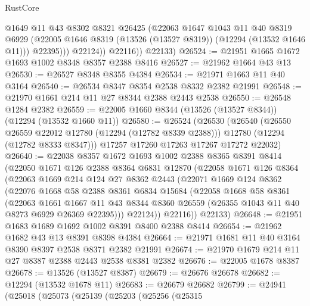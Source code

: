 \begin{lexlean}{RustCore}
\begin{coremodule}
                  @1649
                  @11
                  @43
                  @8302
                  @8321
                  @26425
                  (@22063
                    @1647
                    @1043
                    @11
                    @40
                    @8319
                    @6929
                    (@22005 @1646 @8319 (@13526 (@13527 @8319)) (@12294 (@13532 @1646 @11)))
                    @22395)))
              @22124))
          @22116))
      @22133)
@26524 := @21951 @1665 @1672 @1693 @1002 @8348 @8357 @2388 @8416
@26527 := @21962 @1664 @43 @13
@26530 := @26527 @8348 @8355 @4384
@26534 := @21971 @1663 @11 @40 @3164
@26540 := @26534 @8347 @8354 @2538 @8332 @2382 @21991
@26548 := @21970 @1661 @214 @11 @27 @8344 @2388 @2443 @2538
@26550 := @26548 @1284 @2382
@26559 := @22005 @1660 @8344 (@13526 (@13527 @8344)) (@12294 (@13532 @1660 @11))
@26580 := @26524
    (@26530
      (@26540
        (@26550 @26559 @22012 @12780 (@12294 (@12782 @8339 @2388)))
        @12780
        (@12294 (@12782 @8333 @8347)))
      @17257
      @17260
      @17263
      @17267
      @17272
      @22032)
@26640 := @22038
    @8357
    @1672
    @1693
    @1002
    @2388
    @8365
    @8391
    @8414
    (@22050
      @1671
      @126
      @2388
      @8364
      @6831
      @12870
      (@22058
        @1671
        @126
        @8364
        (@22063
          @1669
          @214
          @124
          @27
          @8362
          @2443
          (@22071
            @1669
            @124
            @8362
            (@22076
              @1668
              @58
              @2388
              @8361
              @6834
              @15684
              (@22058
                @1668
                @58
                @8361
                (@22063
                  @1661
                  @1667
                  @11
                  @43
                  @8344
                  @8360
                  @26559
                  (@26355 @1043 @11 @40 @8273 @6929 @26369 @22395)))
              @22124))
          @22116))
      @22133)
@26648 := @21951 @1683 @1689 @1692 @1002 @8391 @8400 @2388 @8414
@26654 := @21962 @1682 @43 @13 @8391 @8398 @4384
@26664 := @21971 @1681 @11 @40 @3164 @8390 @8397 @2538 @8371 @2382 @21991
@26674 := @21970 @1679 @214 @11 @27 @8387 @2388 @2443 @2538 @8381 @2382
@26676 := @22005 @1678 @8387
@26678 := @13526 (@13527 @8387)
@26679 := @26676 @26678
@26682 := @12294 (@13532 @1678 @11)
@26683 := @26679 @26682
@26799 := @24941
    (@25018
      (@25073
        (@25139
          (@25203
            (@25256
              (@25315

\end{coremodule}
\end{lexlean}
